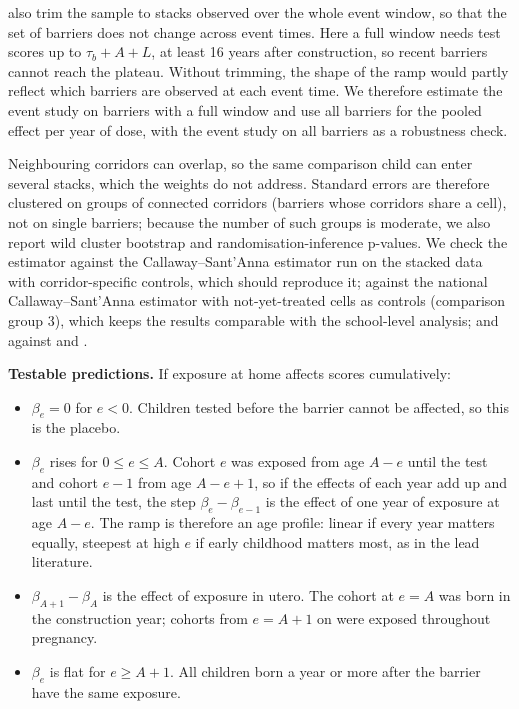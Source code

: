 \documentclass[11pt]{article}
\begin{document}
\textcite{wingStackedDifferenceinDifferences2024} also trim the sample to stacks observed over the whole event window, so that the set of barriers does not change across event times. Here a full window needs test scores up to \(\tau_b + A + L\), at least 16 years after construction, so recent barriers cannot reach the plateau. Without trimming, the shape of the ramp would partly reflect which barriers are observed at each event time. We therefore estimate the event study on barriers with a full window and use all barriers for the pooled effect per year of dose, with the event study on all barriers as a robustness check.

Neighbouring corridors can overlap, so the same comparison child can enter several stacks, which the weights do not address. Standard errors are therefore clustered on groups of connected corridors (barriers whose corridors share a cell), not on single barriers; because the number of such groups is moderate, we also report wild cluster bootstrap and randomisation-inference p-values. We check the estimator against the Callaway--Sant'Anna estimator run on the stacked data with corridor-specific controls, which should reproduce it; against the national Callaway--Sant'Anna estimator with not-yet-treated cells as controls (comparison group 3), which keeps the results comparable with the school-level analysis; and against \textcite{sunEstimatingDynamicTreatment2021} and \textcite{borusyakRevisitingEventStudyDesigns2024}.

\textbf{Testable predictions.} If exposure at home affects scores cumulatively:

\begin{itemize}
\item \(\beta_e = 0\) for \(e < 0\). Children tested before the barrier cannot be affected, so this is the placebo.
\item \(\beta_e\) rises for \(0 \le e \le A\). Cohort \(e\) was exposed from age \(A - e\) until the test and cohort \(e-1\) from age \(A - e + 1\), so if the effects of each year add up and last until the test, the step \(\beta_e - \beta_{e-1}\) is the effect of one year of exposure at age \(A - e\). The ramp is therefore an age profile: linear if every year matters equally, steepest at high \(e\) if early childhood matters most, as in the lead literature.
\item \(\beta_{A+1} - \beta_A\) is the effect of exposure in utero. The cohort at \(e = A\) was born in the construction year; cohorts from \(e = A + 1\) on were exposed throughout pregnancy.
\item \(\beta_e\) is flat for \(e \ge A + 1\). All children born a year or more after the barrier have the same exposure.
\end{itemize}
\end{document}
